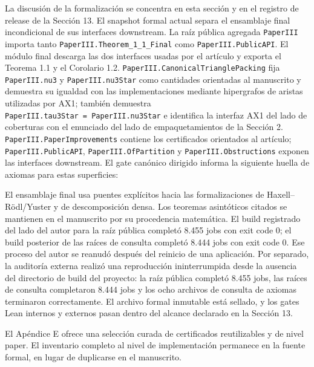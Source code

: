 \documentclass[
  spanish,
  11pt,
  a4paper,
]{article}
\newenvironment{Shaded}{}{}
\newcommand{\NormalTok}[1]{#1}
\begin{document}
La discusión de la formalización se concentra en esta sección y en el registro de release de la Sección 13. El snapshot formal actual separa el ensamblaje final incondicional de sus interfaces downstream. La raíz pública agregada \texttt{PaperIII} importa tanto \texttt{PaperIII.Theorem\_1\_1\_Final} como \texttt{PaperIII.PublicAPI}. El módulo final descarga las dos interfaces usadas por el artículo y exporta el Teorema 1.1 y el Corolario 1.2. \texttt{PaperIII.CanonicalTrianglePacking} fija \texttt{PaperIII.nu3} y \texttt{PaperIII.nu3Star} como cantidades orientadas al manuscrito y demuestra su igualdad con las implementaciones mediante hipergrafos de aristas utilizadas por AX1; también demuestra \texttt{PaperIII.tau3Star\ =\ PaperIII.nu3Star} e identifica la interfaz AX1 del lado de coberturas con el enunciado del lado de empaquetamientos de la Sección 2. \texttt{PaperIII.PaperImprovements} contiene los certificados orientados al artículo; \texttt{PaperIII.PublicAPI}, \texttt{PaperIII.OfPartition} y \texttt{PaperIII.Obstructions} exponen las interfaces downstream. El gate canónico dirigido informa la siguiente huella de axiomas para estas superficies:

\begin{Shaded}
\begin{Highlighting}[]
\NormalTok{[propext, Classical.choice, Quot.sound]}
\end{Highlighting}
\end{Shaded}

El ensamblaje final usa puentes explícitos hacia las formalizaciones de Haxell--Rödl/Yuster y de descomposición densa. Los teoremas asintóticos citados se mantienen en el manuscrito por su procedencia matemática. El build registrado del lado del autor para la raíz pública completó 8.455 jobs con exit code 0; el build posterior de las raíces de consulta completó 8.444 jobs con exit code 0. Ese proceso del autor se reanudó después del reinicio de una aplicación. Por separado, la auditoría externa realizó una reproducción ininterrumpida desde la ausencia del directorio de build del proyecto: la raíz pública completó 8.455 jobs, las raíces de consulta completaron 8.444 jobs y los ocho archivos de consulta de axiomas terminaron correctamente. El archivo formal inmutable está sellado, y los gates Lean internos y externos pasan dentro del alcance declarado en la Sección 13.

El Apéndice E ofrece una selección curada de certificados reutilizables y de nivel paper. El inventario completo al nivel de implementación permanece en la fuente formal, en lugar de duplicarse en el manuscrito.
\end{document}
